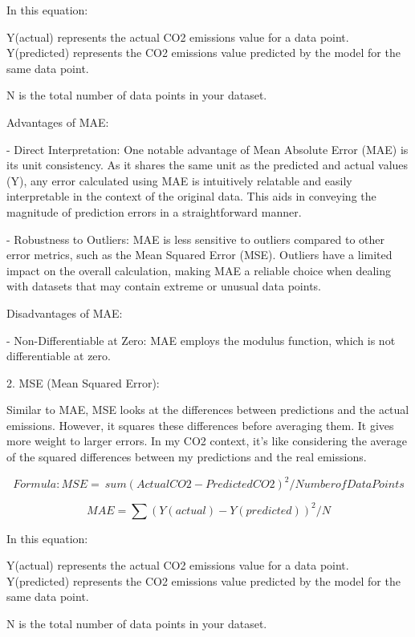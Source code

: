 \documentclass[12pt, a4paper,oneside]{book}
\numberwithin{equation}{section}
\begin{document}
In this equation:

Y(actual) represents the actual CO2 emissions value for a data point.
Y(predicted) represents the CO2 emissions value predicted by the model for the same data point.

N is the total number of data points in your dataset.

\hfill \break 

Advantages of MAE:

- Direct Interpretation: One notable advantage of Mean Absolute Error (MAE) is its unit consistency. As it shares the same unit as the predicted and actual values (Y), any error calculated using MAE is intuitively relatable and easily interpretable in the context of the original data. This aids in conveying the magnitude of prediction errors in a straightforward manner.

- Robustness to Outliers: MAE is less sensitive to outliers compared to other error metrics, such as the Mean Squared Error (MSE). Outliers have a limited impact on the overall calculation, making MAE a reliable choice when dealing with datasets that may contain extreme or unusual data points.

Disadvantages of MAE:

- Non-Differentiable at Zero: MAE employs the modulus function, which is not differentiable at zero. 

2. MSE (Mean Squared Error): 

Similar to MAE, MSE looks at the differences between predictions and the actual emissions. However, it squares these differences before averaging them. It gives more weight to larger errors. In my CO2 context, it's like considering the average of the squared differences between my predictions and the real emissions.~\cite{ref13}


\begin{equation}
    Formula: MSE = \ sum(Actual CO2 - Predicted CO2)^2 / Number of Data Points
\end{equation}

\begin{equation}
    MAE = \sum (Y(actual) - Y(predicted))^2 / N
\end{equation}

In this equation:

Y(actual) represents the actual CO2 emissions value for a data point.
Y(predicted) represents the CO2 emissions value predicted by the model for the same data point.

N is the total number of data points in your dataset.
\end{document}
